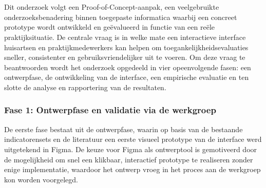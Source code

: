 
\chapter{}%
\label{ch:methodologie}


Dit onderzoek volgt een Proof-of-Concept-aanpak, een veelgebruikte onderzoeksbenadering binnen toegepaste informatica waarbij een concreet prototype wordt ontwikkeld en geëvalueerd in functie van een reële praktijksituatie.
De centrale vraag is in welke mate een interactieve interface huisartsen en praktijkmedewerkers kan helpen om toegankelijkheidsevaluaties sneller, consistenter en gebruiksvriendelijker uit te voeren.
Om deze vraag te beantwoorden wordt het onderzoek opgedeeld in vier opeenvolgende fasen: een ontwerpfase, de ontwikkeling van de interface, een empirische evaluatie en ten slotte de analyse en rapportering van de resultaten.
\subsection{Fase 1: Ontwerpfase en validatie via de werkgroep}
\label{ter:Ontwerpfase}

De eerste fase bestaat uit de ontwerpfase, waarin op basis van de bestaande indicatorensets en de literatuur een eerste visueel prototype van de interface werd uitgetekend in Figma. 
De keuze voor Figma als ontwerptool is gemotiveerd door de mogelijkheid om snel een klikbaar, interactief prototype te realiseren zonder enige implementatie, 
waardoor het ontwerp vroeg in het proces aan de werkgroep kon worden voorgelegd. 
\medskip

